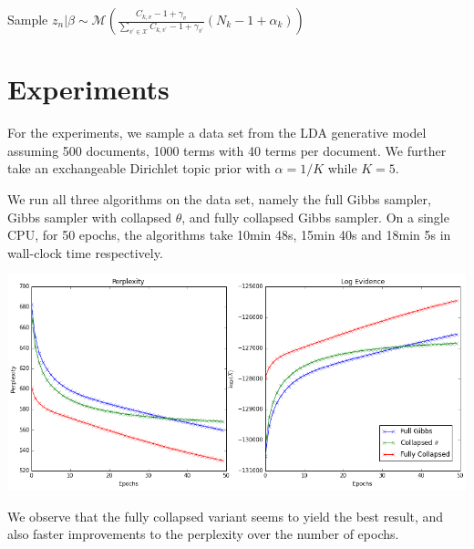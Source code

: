 \documentclass[a0,portrait]{a0poster}
\begin{document}
\begin{multicols}{2}
\begin{minipage}{\linewidth}
	\label{alg:collapsed}
	\begin{algorithmic}[1]
		\State Sample $z_n | \beta \sim \mathcal{M}(\frac{C_{k,v}  -1 + \gamma_{v}}{\sum_{ v^{\prime} \in \mathcal{X}}C_{k,v^{\prime}} - 1 + \gamma_{v^{\prime}}} (N_k - 1 + \alpha_k))$ 
		\EndFor
		\EndFor
		\EndFor
		\EndFunction
	\end{algorithmic}
\end{minipage}

\section{Experiments}

For the experiments, we sample a data set from the LDA generative model assuming 500 documents, 1000 terms with 40 terms per document. We further take an exchangeable Dirichlet topic prior with $\alpha = 1/K$ while $K = 5$. 

We run all three algorithms on the data set, namely the full Gibbs sampler, Gibbs sampler with collapsed $\theta$, and fully collapsed Gibbs sampler. On a single CPU, for 50 epochs, the algorithms take 10min 48s, 15min 40s and 18min 5s in wall-clock time respectively.

\vspace{2cm}
\begin{minipage}{\linewidth}
	\centering
	\label{fig:results}
	\includegraphics{results3}
\end{minipage}

We observe that the fully collapsed variant seems to yield the best result, and also faster improvements to the perplexity over the number of epochs. 



\end{multicols}
\end{document}

